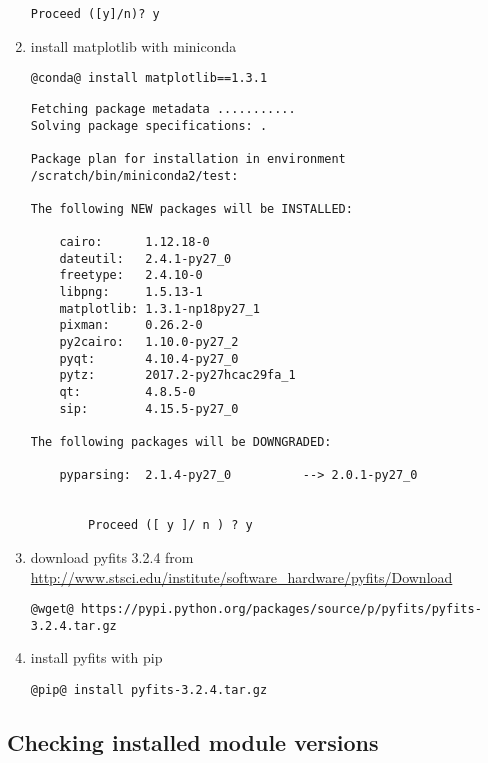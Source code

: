 \begin{enumerate}
\begin{lstlisting}[style=bashstyle]
          Proceed ([y]/n)? y
\end{lstlisting}

\item  install matplotlib with miniconda
\begin{lstlisting}[style=bashstyle]
@conda@ install matplotlib==1.3.1
\end{lstlisting}
\begin{lstlisting}[style=bashstyle]
Fetching package metadata ...........
Solving package specifications: .

Package plan for installation in environment /scratch/bin/miniconda2/test:

The following NEW packages will be INSTALLED:

    cairo:      1.12.18-0
    dateutil:   2.4.1-py27_0
    freetype:   2.4.10-0
    libpng:     1.5.13-1
    matplotlib: 1.3.1-np18py27_1
    pixman:     0.26.2-0
    py2cairo:   1.10.0-py27_2
    pyqt:       4.10.4-py27_0
    pytz:       2017.2-py27hcac29fa_1
    qt:         4.8.5-0
    sip:        4.15.5-py27_0

The following packages will be DOWNGRADED:

    pyparsing:  2.1.4-py27_0          --> 2.0.1-py27_0

            
        Proceed ([ y ]/ n ) ? y

\end{lstlisting}

\item  download pyfits 3.2.4 from \url{http://www.stsci.edu/institute/software_hardware/pyfits/Download}
\begin{lstlisting}[style=bashstyle]
@wget@ https://pypi.python.org/packages/source/p/pyfits/pyfits-3.2.4.tar.gz
\end{lstlisting}

\item  install pyfits with pip
\begin{lstlisting}[style=bashstyle]
@pip@ install pyfits-3.2.4.tar.gz
\end{lstlisting}

\end{enumerate}


\subsection{Checking installed module versions}
\label{section:check-versions}

